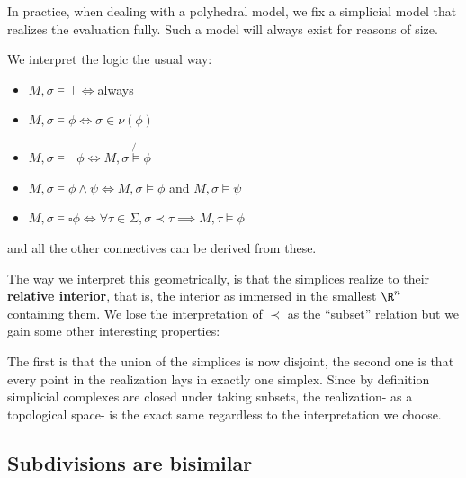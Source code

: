 In practice, when dealing with a polyhedral model, we fix a simplicial model that realizes the evaluation fully. Such a model will always exist 
for reasons of size.

We interpret the logic the usual way: 

\begin{itemize}
    \item $M,\sigma\models \top\iff $always
    \item $M,\sigma\models\phi\iff \sigma\in\nu(\phi)$
    \item $M,\sigma\models\lnot\phi\iff M,\sigma\not{\models}\phi$
    \item $M,\sigma\models\phi\wedge\psi\iff M,\sigma\models\phi$ and $M,\sigma\models\psi$
    \item $M,\sigma\models \square\phi \iff \forall \tau\in \Sigma, \sigma\prec\tau\implies M,\tau\models\phi$
\end{itemize}
and all the other connectives can be derived from these. 

The way we interpret this geometrically, is that the simplices realize to their \textbf{relative interior}, that is, the interior as immersed 
in the smallest $\R^n$ containing them. We lose the interpretation of $\prec$ as the ``subset'' relation but we gain some other interesting properties:

The first is that the union of the simplices is now disjoint, the second one is that every point in the realization lays in exactly one simplex. Since by definition
simplicial complexes are closed under taking subsets, the realization- as a topological space- is the exact same regardless to the interpretation we choose.


\subsection{Subdivisions are bisimilar}
